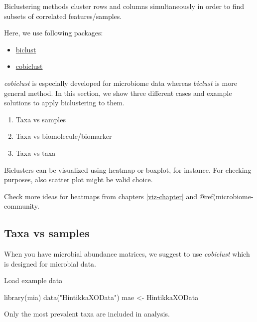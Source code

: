 \documentclass[
]{book}
\newenvironment{Shaded}{\begin{snugshade}}{\end{snugshade}}
\newcommand{\FunctionTok}[1]{\textcolor[rgb]{0.00,0.00,0.00}{#1}}
\newcommand{\NormalTok}[1]{#1}
\newcommand{\OtherTok}[1]{\textcolor[rgb]{0.56,0.35,0.01}{#1}}
\newcommand{\StringTok}[1]{\textcolor[rgb]{0.31,0.60,0.02}{#1}}
\providecommand{\tightlist}{%
  \setlength{\itemsep}{0pt}\setlength{\parskip}{0pt}}
\begin{document}
Biclustering methods cluster rows and columns simultaneously in order
to find subsets of correlated features/samples.

Here, we use following packages:

\begin{itemize}
\tightlist
\item
  \href{https://cran.r-project.org/web/packages/biclust/index.html}{biclust}
\item
  \href{https://besjournals.onlinelibrary.wiley.com/doi/abs/10.1111/2041-210X.13582}{cobiclust}
\end{itemize}

\emph{cobiclust} is especially developed for microbiome data whereas \emph{biclust} is more
general method. In this section, we show three different cases and example
solutions to apply biclustering to them.

\begin{enumerate}
\def\labelenumi{\arabic{enumi}.}
\tightlist
\item
  Taxa vs samples
\item
  Taxa vs biomolecule/biomarker
\item
  Taxa vs taxa
\end{enumerate}

Biclusters can be visualized using heatmap or boxplot, for instance. For checking purposes,
also scatter plot might be valid choice.

Check more ideas for heatmaps from chapters \ref{viz-chapter} and @ref(microbiome-community.

\hypertarget{taxa-vs-samples}{%
\subsection{Taxa vs samples}\label{taxa-vs-samples}}

When you have microbial abundance matrices, we suggest to use \emph{cobiclust} which is
designed for microbial data.

Load example data

\begin{Shaded}
\begin{Highlighting}[]
\FunctionTok{library}\NormalTok{(mia)}
\FunctionTok{data}\NormalTok{(}\StringTok{"HintikkaXOData"}\NormalTok{)}
\NormalTok{mae }\OtherTok{\textless{}{-}}\NormalTok{ HintikkaXOData}
\end{Highlighting}
\end{Shaded}

Only the most prevalent taxa are included in analysis.
\end{document}

